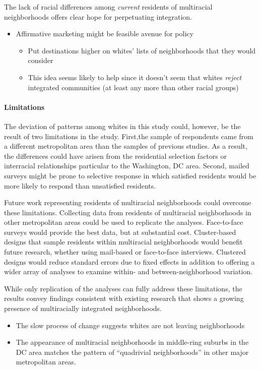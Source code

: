 \documentclass{baderart}
\begin{document}
The lack of racial differences among \emph{current} residents of multiracial neighborhoods offers clear hope for perpetuating integration. 

\begin{itemize}
\item Affirmative marketing might be feasible avenue for policy
\begin{itemize}
\item Put destinations higher on whites' lists of neighborhoods that they would consider
\item This idea seems likely to help since it doesn't seem that whites \emph{reject} integrated communities (at least any more than other racial groups)
\end{itemize}
\end{itemize}

\paragraph{Limitations}
The deviation of patterns among whites in this study could, however, be the result of two limitations in the study. First,the sample of respondents came from a different metropolitan area than the samples of previous studies. As a result, the differences could have arisen from the residential selection factors or interracial relationships particular to the Washington, DC area. Second, mailed surveys might be prone to selective response in which satisfied residents would be more likely to respond than unsatisfied residents. 

Future work representing residents of multiracial neighborhoods could overcome these limitations. Collecting data from residents of multiracial neighborhoods in other metropolitan areas could be used to replicate the analyses. Face-to-face surveys would provide the best data, but at substantial cost. Cluster-based designs that sample residents within multiracial neighborhoods would benefit future research, whether using mail-based or face-to-face interviews. Clustered designs would reduce standard errors due to fixed effects in addition to offering a wider array of analyses to examine within- and between-neighborhood variation.

While only replication of the analyses can fully address these limitations, the results convey findings consistent with existing research that shows a growing presence of multiracially integrated neighborhoods. 
\begin{itemize}
\item The slow process of change suggests whites are not leaving neighborhoods
\item The appearance of multiracial neighborhoods in middle-ring suburbs in the DC area matches the pattern of ``quadrivial neighborhoods'' in other major metropolitan areas.
\end{itemize}
\end{document}
